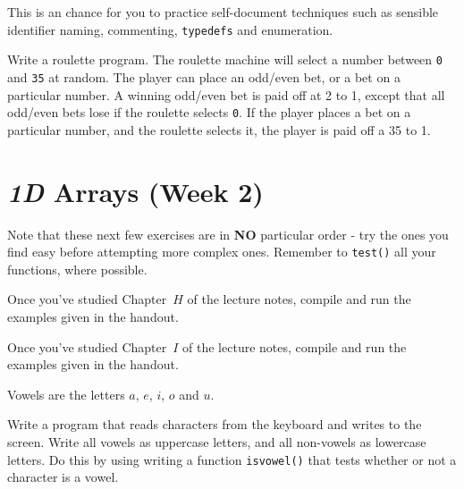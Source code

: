 This is an chance for you to practice self-document techniques such as
sensible identifier naming, commenting, \verb^typedefs^ and enumeration. 
\begin{exercise}
Write a roulette program. The roulette machine will select
a number between \verb^0^ and \verb^35^ at random. The player
can place an odd/even bet, or a bet on a particular number.
A winning odd/even bet is paid off at 2 to 1, except
that all odd/even bets lose if the roulette selects \verb^0^.
If the player places a bet on a particular number, and the
roulette selects it, the player is paid off a 35 to 1.
\end{exercise}


\chapter{{\em 1D} Arrays (Week 2)}

Note that these next few exercises are  in {\bf NO} particular order - try the ones you find easy before attempting more complex ones. Remember to \verb^test()^ all your functions, where possible.










\begin{exercise}
Once you've studied Chapter~$H$ of the lecture notes, 
compile and run the examples given in the handout.
\end{exercise}





\begin{exercise}
Once you've studied Chapter~$I$ of the lecture notes, compile and run
the examples given in the handout.
\end{exercise}

Vowels are the letters $a$, $e$, $i$, $o$ and $u$.
\begin{exercise}
Write a program that reads characters from the keyboard and writes to the
screen. Write all vowels as uppercase letters, and all non-vowels as
lowercase letters. Do this by using writing a function \verb^isvowel()^
that tests whether or not a character is a vowel.
\end{exercise}


